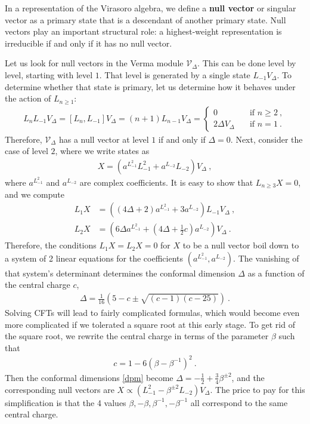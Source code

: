 \documentclass[12pt, a4paper]{article}
\newcommand{\myindex}[1]{\textbf{\boldmath #1}}
\theoremstyle{break}
\begin{document}
In a representation of the Virasoro algebra, we define a \myindex{null vector} or singular vector as a primary state that is a descendant of another primary state. Null vectors play an important structural role: a highest-weight representation is irreducible if and only if it has no null vector. 

Let us look for null vectors in the Verma module $\mathcal{V}_\Delta$. This can be done level by level, starting with level $1$. That level is generated by a single state $L_{-1}V_\Delta$. To determine whether that state is primary, let us determine how it behaves under the action of $L_{n\geq 1}$:
\begin{align}
L_n L_{-1}V_\Delta = [L_n, L_{-1}] V_\Delta = (n+1) L_{n-1}V_\Delta = 
\left\{\begin{array}{ll} 0 &  \quad \text{if } n\geq 2\ , \\ 2\Delta V_\Delta & \quad \text{if } n = 1\ . \end{array}\right. 
\end{align}
Therefore, $\mathcal{V}_\Delta$ has a null vector at level $1$ if and only if $\Delta=0$. Next, consider the case of level $2$, where we write states as 
\begin{align}
 X{} = \left(a^{L_{-1}^2} L_{-1}^2 + a^{L_{-2}} L_{-2}\right) V_\Delta\ ,
\end{align}
where $a^{L_{-1}^2}$ and $a^{L_{-2}}$ are complex coefficients. It is easy to show that $L_{n\geq 3}X{}=0$, and we compute 
\begin{subequations}
\label{l1x}
\begin{align}
 L_1X{} &= \left((4\Delta+2)a^{L_{-1}^2} + 3a^{L_{-2}}\right) L_{-1}V_\Delta\ ,
\\
L_2 X{} &= \left(6\Delta a^{L_{-1}^2}+(4\Delta+\tfrac12 c) a^{L_{-2}}\right)V_\Delta\ .
\end{align}
\end{subequations}
Therefore, the conditions $L_1X{}=L_2 X{}=0$ for $X{}$ to be a null vector boil down to a system of 2 linear equations for the coefficients $(a^{L_{-1}^2},a^{L_{-2}})$. The vanishing of that system's determinant determines the conformal dimension $\Delta$ as a function of the central charge $c$,
\begin{align}
 \Delta = \frac{1}{16}\left( 5-c\pm\sqrt{(c-1)(c-25)} \right) \ .
 \label{dpm}
\end{align}
Solving CFTs will lead to fairly complicated formulas, which would become even more complicated if we tolerated a square root at this early stage.
To get rid of the square root, we rewrite the central charge in terms of the parameter $\beta$ such that 
\begin{align}
 \boxed{c = 1- 6\left(\beta - \beta^{-1}\right)^2 } \ .
 \label{cb}
\end{align}
Then the conformal dimensions \eqref{dpm} become 
$
 \Delta = -\frac12 + \frac34\beta^{\pm 2}
$, and the corresponding null vectors are $X\propto \left(L_{-1}^2 -\beta^{\pm 2}L_{-2}\right)V_\Delta$.
The price to pay for this simplification is that the 4 values $\beta,-\beta,\beta^{-1},-\beta^{-1}$ all correspond to the same central charge. 
\end{document}
